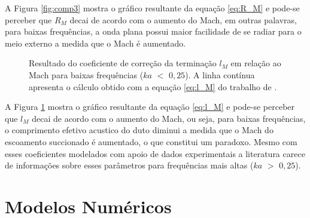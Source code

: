 A Figura \ref{fig:comp3} mostra o gráfico resultante da equação \ref{eq:R_M} e pode-se perceber que $R_{M}$ decai de acordo com o aumento do Mach, em outras palavras, para baixas frequências, a onda plana possui maior facilidade de se radiar para o meio externo a medida que o Mach é aumentado. 


\begin{figure}[h!]
\centering
  \caption[Coeficiente de correção da terminação $l_{M}$]{Resultado do coeficiente de correção da terminação $l_{M}$ em relação ao Mach para baixas frequências ($ka$ $<$ $0,25$). A linha contínua apresenta o cálculo obtido com a equação \ref{eq:l_M} do trabalho de .}
  \label{fig:comp4}
\end{figure}

 A Figura \ref{fig:comp4} mostra o gráfico resultante da equação \ref{eq:l_M} e pode-se perceber que $l_{M}$ decai de acordo com o aumento do Mach, ou seja, para baixas frequências, o comprimento efetivo acustico do duto diminui a medida que o Mach do escoamento succionado é aumentado, o que constitui um paradoxo. Mesmo com esses coeficientes modelados com apoio de dados experimentais a literatura carece de informações sobre esses parâmetros para frequências mais altas ($ka$ $>$ $0,25$).


\section{Modelos Numéricos}

